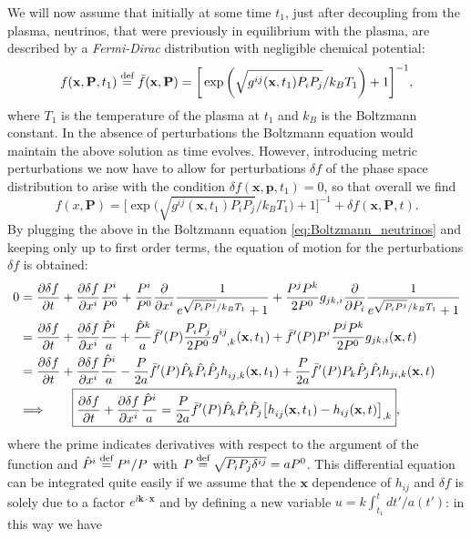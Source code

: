We will now assume that initially at some time $t_1$, just after decoupling from the plasma, neutrinos, that were previously in equilibrium with the plasma, are described by a \emph{Fermi-Dirac} distribution with negligible chemical potential:
$$f(\mathbf{x},\mathbf{P},t_1)\stackrel{\text{def}}{=}\bar f(\mathbf{x},\mathbf{P})=\bigg[\exp\bigg(\sqrt{g^{ij}(\mathbf x,t_1)P_iP_j}/k_B T_1\bigg)+1\bigg]^{-1},$$
where $T_1$ is the temperature of the plasma at $t_1$ and $k_B$ is the Boltzmann constant. In the absence of perturbations the Boltzmann equation would maintain the above solution as time evolves. However, introducing metric perturbations we now have to allow for perturbations $\delta f$ of the phase space distribution to arise with the condition $\delta f(\mathbf x,\mathbf p, t_1)=0$, so that overall we find
$$f(x,\mathbf P)=\bigg[\exp\bigg(\sqrt{g^{ij}(\mathbf x,t_1)P_iP_j}/k_B T_1\bigg)+1\bigg]^{-1}+\delta f(\mathbf{x},\mathbf{P},t).$$
By plugging the above in the Boltzmann equation \eqref{eq:Boltzmann_neutrinos} and keeping only up to first order terms, the equation of motion for the perturbations $\delta f$ is obtained:
\begin{align*}
   0&=\frac{\partial \delta f}{\partial t}+\frac{\partial \delta f}{\partial x^i}\frac{P^i}{P^0}+\frac{P^i}{P^0}\frac{\partial }{\partial x^i}\frac{1}{e^{\sqrt{P_iP^j}/k_BT_1}+1}+\frac{P^jP^k}{2P^0}g_{jk,i}\frac{\partial }{\partial P_i}\frac{1}{e^{\sqrt{P_iP^j}/k_BT_1}+1}\\&= \frac{\partial \delta f}{\partial t}+\frac{\partial \delta f}{\partial x^i}\frac{\hat P^i}{a}+\frac{\hat P^k}{a}\bar f'(P)\frac{P_iP_j}{2P^0}\tensor{g}{^i^j_,_k}(\mathbf{x},t_1)+\bar f'(P)P^i\frac{P^jP^k}{2P^0}g_{jk,i}(\mathbf x, t) \\&= \frac{\partial \delta f}{\partial t}+\frac{\partial \delta f}{\partial x^i}\frac{\hat P^i}{a}-\frac{P}{2a}\bar f'(P)\hat P_k\hat P_i\hat P_j\tensor{h}{_i_j_,_k}(\mathbf{x},t_1)+\frac{P}{2a}\bar f'(P)P_k\hat P_j\hat P_ih_{ji,k}(\mathbf x, t)\\
   &\Longrightarrow\qquad \boxed{\frac{\partial \delta f}{\partial t}+\frac{\partial \delta f}{\partial x^i}\frac{\hat P^i}{a}=\frac{P}{2a}\bar f'(P)\hat P_k\hat P_i\hat P_j\big[\tensor{h}{_i_j}(\mathbf{x},t_1)-h_{ij}(\mathbf x, t)\big]_{,k}},
\end{align*}
where the prime indicates derivatives with respect to the argument of the function and $\hat P^i\stackrel{\text{def}}{=} P^i/P$ with $P\stackrel{\text{def}}{=}{\sqrt{P_iP_j\delta^{ij}}}=a P^0$. This differential equation can be integrated quite easily if we assume that the $\mathbf x$ dependence of $h_{ij}$ and $\delta f$ is solely due to a factor $e^{i\mathbf{k\cdot x}}$ and by defining a new variable $u= k\int_{t_1}^{t}dt'/a(t')$: in this way we have
